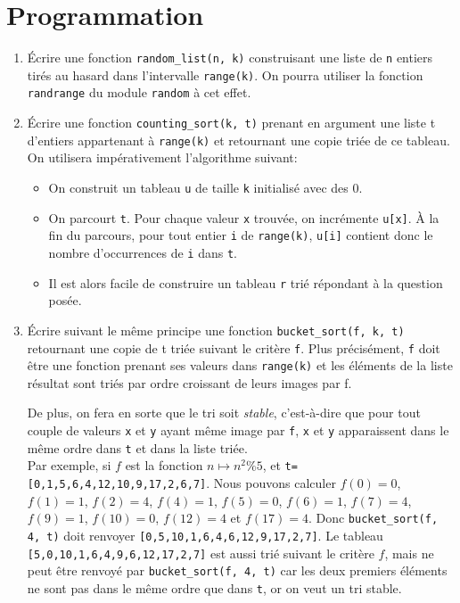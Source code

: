 \section{Programmation}
\begin{enumerate}
\item Écrire une fonction \texttt{random\_list(n, k)} construisant une
  liste de \texttt{n} entiers tirés au hasard dans l'intervalle
  \texttt{range(k)}. On pourra utiliser la fonction \texttt{randrange} du
  module \texttt{random} à cet effet.
\item Écrire une fonction \texttt{counting\_sort(k, t)} prenant en
  argument une liste t d'entiers appartenant à \texttt{range(k)} et
  retournant une copie triée de ce tableau. On utilisera
  impérativement l'algorithme suivant:
  \begin{itemize}
  \item On construit un tableau \texttt{u} de taille \texttt{k}
    initialisé avec des $0$.
  \item On parcourt \texttt{t}. Pour chaque valeur \texttt{x} trouvée, on
    incrémente \texttt{u[x]}. À la fin du parcours, pour tout entier
    \texttt{i} de \texttt{range(k)}, \texttt{u[i]} contient donc le nombre d'occurrences
    de \texttt{i} dans \texttt{t}.
  \item Il est alors facile de construire un tableau \texttt{r} trié
    répondant à la question posée.
  \end{itemize}
\item Écrire suivant le même principe une fonction \texttt{bucket\_sort(f,
    k, t)} retournant une copie de t triée suivant le critère
  \texttt{f}. Plus précisément, \texttt{f} doit être une fonction prenant ses
  valeurs dans \texttt{range(k)} et les éléments de la liste résultat sont
  triés par ordre croissant de leurs images par f.

  De plus, on fera en sorte que le tri soit \emph{stable},
  c'est-à-dire que pour tout couple de valeurs \texttt{x} et \texttt{y} ayant
  même image par \texttt{f}, \texttt{x} et \texttt{y} apparaissent dans le même
  ordre dans \texttt{t} et dans la liste triée.\\

Par exemple, si $f$ est la fonction $n\mapsto n^2 \% 5$, et \texttt{t=[0,1,5,6,4,12,10,9,17,2,6,7]}. Nous pouvons 
calculer $f(0)=0$, $f(1)=1$, $f(2)=4$, $f(4)=1$, $f(5)=0$, $f(6)=1$, $f(7)=4$, $f(9)=1$, $f(10)=0$, $f(12)=4$ et 
$f(17)=4$. Donc \texttt{bucket\_sort(f, 4, t)} doit renvoyer \texttt{[0,5,10,1,6,4,6,12,9,17,2,7]}. Le tableau  
\texttt{[5,0,10,1,6,4,9,6,12,17,2,7]} est aussi trié suivant le critère $f$, mais ne peut être renvoyé par 
\texttt{bucket\_sort(f, 4, t)} car les deux premiers éléments ne sont pas dans le même ordre que dans \texttt{t}, or on 
veut un tri stable.


\end{enumerate}
